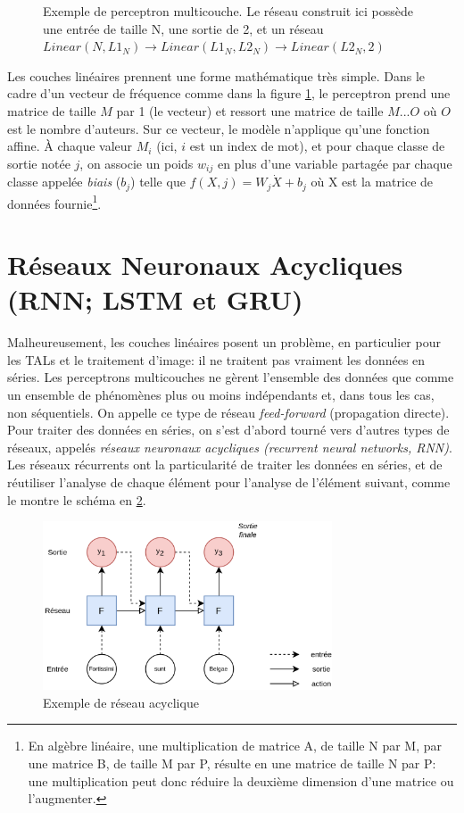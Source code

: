 \begin{figure}[h]
\begin{minipage}{.60\linewidth}
        \caption{Exemple de perceptron multicouche. Le réseau construit ici possède une entrée de taille N, une sortie de 2, et un réseau $Linear(N, L1_N) \rightarrow Linear(L1_N, L2_N) \rightarrow Linear(L2_N, 2)$}
        \label{fig:deep-learning:mlp}
    \end{minipage}%
\end{figure}

Les couches linéaires prennent une forme mathématique très simple. Dans le cadre d'un vecteur de fréquence comme dans la figure \ref{fig:deep-learning:mlp}, le perceptron prend une matrice de taille $M$ par 1 (le vecteur) et ressort une matrice de taille $M...O$ où $O$ est le nombre d'auteurs. Sur ce vecteur, le modèle n'applique qu'une fonction affine. À chaque valeur $M_{i}$ (ici, $i$ est un index de mot), et pour chaque classe de sortie notée $j$, on associe un poids $w_{ij}$ en plus d'une variable partagée par chaque classe appelée \textit{biais} ($b_{j}$) telle que $f(X, j) = W_{j} \dot X + b_{j}$  où X est la matrice de données fournie\footnote{En algèbre linéaire, une multiplication de matrice A, de taille N par M, par une matrice B, de taille M par P, résulte en une matrice de taille N par P: une multiplication peut donc réduire la deuxième dimension d'une matrice ou l'augmenter.}.


\section{Réseaux Neuronaux Acycliques (RNN; LSTM et GRU)}

Malheureusement, les couches linéaires posent un problème, en particulier pour les TALs et le traitement d'image: il ne traitent pas vraiment les données en séries. Les perceptrons multicouches ne gèrent l'ensemble des données que comme un ensemble de phénomènes plus ou moins indépendants et, dans tous les cas, non séquentiels. On appelle ce type de réseau \textit{feed-forward} (propagation directe). Pour traiter des données en séries, on s'est d'abord tourné vers d'autres types de réseaux, appelés \textit{réseaux neuronaux acycliques (recurrent neural networks, RNN)}. Les réseaux récurrents ont la particularité de traiter les données en séries, et de réutiliser l'analyse de chaque élément pour l'analyse de l'élément suivant, comme le montre le schéma en \ref{fig:deep-learning:rnn}.

\begin{figure}[h]
    \centering
    \includegraphics[height=5cm]{results/deep-learning/explanations/RNN.png}
    \caption{Exemple de réseau acyclique}
    \label{fig:deep-learning:rnn}
\end{figure}


